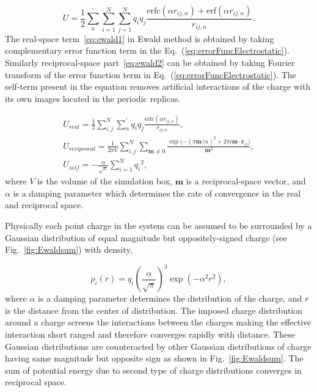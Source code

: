 \begin{equation}
U = \frac{1}{2}\sum_n^{'}{\sum_{i=1}^N { \sum_{j=1}^N {q_i q_j}}}\frac{\mathrm{erfc}(\alpha r_{ij,n})+\mathrm{erf}(\alpha r_{ij,n})}{r_{ij,n}}.
\label{eq:errorFuncElectrostatic}
\end{equation} 
The real-space term~\ref{eq:ewald1} in Ewald method is obtained by taking complementary error function term in the Eq.~(\ref{eq:errorFuncElectrostatic}). Similarly reciprocal-space part~\ref{eq:ewald2} can be obtained by taking Fourier transform of the error function term in Eq.~(\ref{eq:errorFuncElectrostatic}). The self-term present in the equation removes artificial interactions of the charge with its own images located in the periodic replicas. 

\begin{subequations}
\begin{gather}
U_{real} = \frac{1}{2} \sum_{i,j}^{N}{\sum_{n}^{'}{{q_i q_j}\frac{\mathrm{erfc}(\alpha r_{ij,n})}{r_{ij,n}}}}, \label{eq:ewald1}\\
U_{reciprocal} = \frac{1}{2\pi V}\sum_{i,j}^{N}{\sum_{\mathbf{m} \neq 0}\frac{\exp(-(\pi \mathbf{m}/\alpha)^2 + 2\pi i \mathbf{m}\cdot{\mathbf{r}_{ij})}}{\mathbf{m}^2}},\label{eq:ewald2} \\
U_{self} = -\frac{\alpha}{\sqrt{\pi}} \sum_{i =1}^{N} {q_i}^2 ,\label{eq:ewald3}
\end{gather}
\end{subequations}
where $V$ is the volume of the simulation box, $\mathbf{m}$ is a reciprocal-space vector, and $\alpha$ is a damping parameter which determines the rate of convergence in the real and reciprocal space. 
 
Physically each point charge in the system can be assumed to be surrounded by a Gaussian distribution of equal magnitude but oppositely-signed charge (see Fig.~\ref{fig:Ewaldsum}) with density,

\begin{equation}
\rho_i (r) = q_i \left(\frac{\alpha}{\sqrt{\pi}}\right)^3 \exp(-\alpha^2 r^2),
\label{eq:chargeDistribution}
\end{equation}
where $\alpha$ is a damping parameter determines the distribution of the charge, and $r$ is the distance from the center of distribution. The imposed charge distribution around a charge screens the interactions between the charges making the effective interaction  short ranged and therefore converges rapidly with distance. These Gaussian distributions are counteracted by other Gaussian distributions of charge having same magnitude but opposite sign as shown in Fig.~\ref{fig:Ewaldsum}. \cite{Toukmaji96} The sum of potential energy due to second type of charge distributions converges in reciprocal space. 

